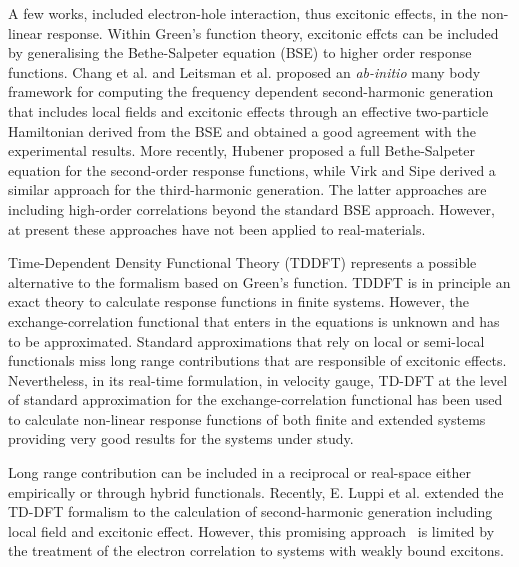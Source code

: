 A few works, included electron-hole interaction, thus excitonic effects, in the non-linear response. Within Green's function theory, excitonic effcts can be included by generalising the Bethe-Salpeter equation (BSE)\cite{strinati} to higher order response functions. Chang et al.\cite{Chang2002} and Leitsman et al.\cite{Leitsmann2005} proposed an \emph{ab-initio} many body framework for computing the frequency dependent second-harmonic generation that includes local fields and excitonic effects through an effective two-particle Hamiltonian derived from the BSE and obtained a good agreement with the experimental results.
More recently, Hubener\cite{PhysRevA.83.062122} proposed a full Bethe-Salpeter equation for the second-order response functions, while Virk and Sipe derived a similar approach for the third-harmonic generation.\cite{PhysRevB.80.165318}
The latter approaches are including high-order correlations beyond the standard BSE approach. However, at present these approaches have not been applied to real-materials. %

Time-Dependent Density Functional Theory (TDDFT)\cite{PhysRevLett.52.997} represents a possible alternative to the formalism based on Green's function. TDDFT is in principle an exact theory to calculate response functions in finite systems. However, the exchange-correlation functional that enters in the equations is unknown and has to be approximated. Standard approximations that rely on local or semi-local functionals miss long range contributions that are responsible of excitonic effects\cite{botti2007time}. Nevertheless, in its real-time formulation, in velocity gauge, TD-DFT at the level of standard approximation for the  exchange-correlation functional has been used to calculate non-linear response functions of both finite and extended systems providing very good results for the systems under study.\cite{takimoto:154114,andrade2007time} %

Long range contribution can be included in a reciprocal or real-space either empirically or through  hybrid functionals.\cite{botti2007time} Recently, E. Luppi et al. extended the TD-DFT formalism to the calculation of second-harmonic generation including local field and excitonic effect.\cite{PhysRevB.82.235201} %
However, this promising approach~\cite{Cazzanelli2012} is limited by the treatment of the electron correlation to systems with weakly bound excitons.~\cite{LRC}


